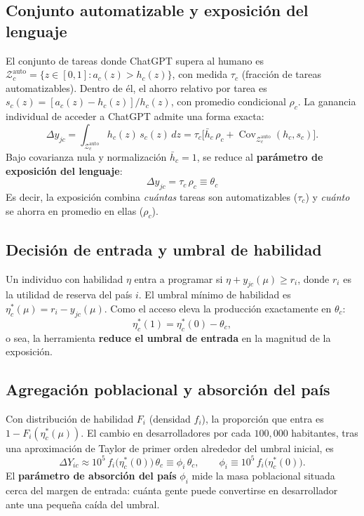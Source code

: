 \documentclass[11pt,a4paper]{article}
\newcommand{\Zauto}{\mathcal{Z}^{\mathrm{auto}}_c}
\newcommand{\Covauto}{\operatorname{Cov}_{\Zauto}}
\newcommand{\dd}{\,dz}
\begin{document}
\subsection{Conjunto automatizable y exposición del lenguaje}

El conjunto de tareas donde ChatGPT supera al humano es $\Zauto=\{z\in[0,1]:a_c(z)>h_c(z)\}$, con medida $\tau_c$ (fracción de tareas automatizables). Dentro de él, el ahorro relativo por tarea es $s_c(z)=[a_c(z)-h_c(z)]/h_c(z)$, con promedio condicional $\rho_c$. La ganancia individual de acceder a ChatGPT admite una forma exacta:
\[
\Delta y_{jc}=\int_{\Zauto}h_c(z)\,s_c(z)\dd=\tau_c\bigl[\bar h_c\,\rho_c+\Covauto(h_c,s_c)\bigr].
\]
Bajo covarianza nula y normalización $\bar h_c=1$, se reduce al \textbf{parámetro de exposición del lenguaje}:
\[
\boxed{\;\Delta y_{jc}=\tau_c\,\rho_c\equiv\theta_c\;}
\]
Es decir, la exposición combina \textit{cuántas} tareas son automatizables ($\tau_c$) y \textit{cuánto} se ahorra en promedio en ellas ($\rho_c$).

\subsection{Decisión de entrada y umbral de habilidad}

Un individuo con habilidad $\eta$ entra a programar si $\eta+y_{jc}(\mu)\ge r_i$, donde $r_i$ es la utilidad de reserva del país $i$. El umbral mínimo de habilidad es $\eta_c^*(\mu)=r_i-y_{jc}(\mu)$. Como el acceso eleva la producción exactamente en $\theta_c$:
\[
\eta_c^*(1)=\eta_c^*(0)-\theta_c,
\]
o sea, la herramienta \textbf{reduce el umbral de entrada} en la magnitud de la exposición.

\subsection{Agregación poblacional y absorción del país}

Con distribución de habilidad $F_i$ (densidad $f_i$), la proporción que entra es $1-F_i(\eta_c^*(\mu))$. El cambio en desarrolladores por cada $100{,}000$ habitantes, tras una aproximación de Taylor de primer orden alrededor del umbral inicial, es
\[
\Delta Y_{ic}\approx 10^5\,f_i\!\bigl(\eta_c^*(0)\bigr)\,\theta_c \equiv \phi_i\,\theta_c,
\qquad
\phi_i\equiv 10^5\,f_i\!\bigl(\eta_c^*(0)\bigr).
\]
El \textbf{parámetro de absorción del país} $\phi_i$ mide la masa poblacional situada cerca del margen de entrada: cuánta gente puede convertirse en desarrollador ante una pequeña caída del umbral.
\end{document}
